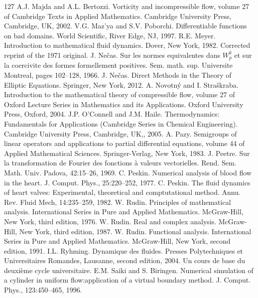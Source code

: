 \begin{thebibliography}{127}
 A.J. Majda and A.L. Bertozzi. Vorticity and incompressible flow, volume 27 of Cambridge Texts in Applied Mathematics. Cambridge University Press, Cambridge, UK, 2002.
 V.G. Maz’ya and S.V. Poborchi. Differentiable functions on bad domains. World Scientific, River Edge, NJ, 1997.
 R.E. Meyer. Introduction to mathematical fluid dynamics. Dover, New York, 1982. Corrected reprint of the 1971 original.
 J. Nečas. Sur les normes equivalentes dans $W_p^k$ et sur la coercivite des formes formellement positives. Sem. math. sup. Universite Montreal, pages 102–128, 1966.
 J. Nečas. Direct Methods in the Theory of Elliptic Equations. Springer, New York, 2012.
 A. Novotný and I. Straškraba. Introduction to the mathematical theory of compressible flow, volume 27 of Oxford Lecture Series in Mathematics and its Applications. Oxford University Press, Oxford, 2004.
 J.P. O’Connell and J.M. Haile. Thermodynamics: Fundamentals for Applications (Cambridge Series in Chemical Engineering). Cambridge University Press, Cambridge, UK,, 2005.
 A. Pazy. Semigroups of linear operators and applications to partial differential equations, volume 44 of Applied Mathematical Sciences. Springer-Verlag, New York, 1983.
 J. Peetre. Sur la transformation de Fourier des fonctions à valeurs vectorielles. Rend. Sem. Math. Univ. Padova, 42:15–26, 1969.
 C. Peskin. Numerical analysis of blood flow in the heart. J. Comput. Phys., 25:220–252, 1977.
 C. Peskin. The fluid dynamics of heart valves: Experimental, theoretical and comptutational method. Annu. Rev. Fluid Mech, 14:235–259, 1982.
 W. Rudin. Principles of mathematical analysis. International Series in Pure and Applied Mathematics. McGraw-Hill, New York, third edition, 1976.
 W. Rudin. Real and complex analysis. McGraw-Hill, New York, third edition, 1987.
 W. Rudin. Functional analysis. International Series in Pure and Applied Mathematics. McGraw-Hill, New York, second edition, 1991.
 I.L. Ryhming. Dynamique des fluides. Presses Polytechniques et Universitaires Romandes, Lausanne, second edition, 2004. Un cours de base du deuxième cycle universitaire.
 E.M. Saiki and S. Biringen. Numerical simulation of a cylinder in uniform flow:application of a virtual boundary method. J. Comput. Phys., 123:450–465, 1996.

\end{thebibliography}
